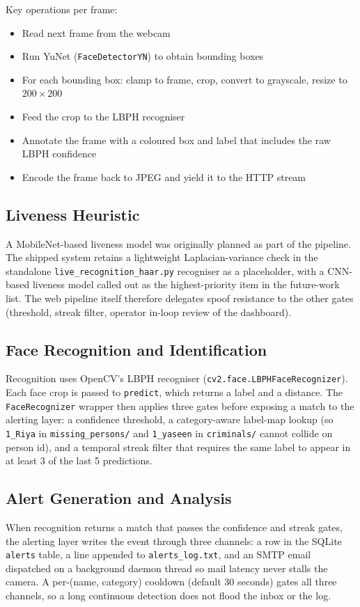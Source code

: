 \documentclass[11pt]{report}
\begin{document}
Key operations per frame:
\begin{itemize}
    \item Read next frame from the webcam
    \item Run YuNet (\texttt{FaceDetectorYN}) to obtain bounding boxes
    \item For each bounding box: clamp to frame, crop, convert to grayscale, resize to $200\times200$
    \item Feed the crop to the LBPH recogniser
    \item Annotate the frame with a coloured box and label that includes the raw LBPH confidence
    \item Encode the frame back to JPEG and yield it to the HTTP stream
\end{itemize}

\subsection{Liveness Heuristic}
A MobileNet-based liveness model was originally planned as part of the pipeline. The shipped system retains a lightweight Laplacian-variance check in the standalone \texttt{live\_recognition\_haar.py} recogniser as a placeholder, with a CNN-based liveness model called out as the highest-priority item in the future-work list. The web pipeline itself therefore delegates spoof resistance to the other gates (threshold, streak filter, operator in-loop review of the dashboard).

\subsection{Face Recognition and Identification}
Recognition uses OpenCV's LBPH recogniser (\texttt{cv2.face.LBPHFaceRecognizer}). Each face crop is passed to \texttt{predict}, which returns a label and a distance. The \texttt{FaceRecognizer} wrapper then applies three gates before exposing a match to the alerting layer: a confidence threshold, a category-aware label-map lookup (so \texttt{1\_Riya} in \texttt{missing\_persons/} and \texttt{1\_yaseen} in \texttt{criminals/} cannot collide on person id), and a temporal streak filter that requires the same label to appear in at least 3 of the last 5 predictions.


\subsection{Alert Generation and Analysis}
When recognition returns a match that passes the confidence and streak gates, the alerting layer writes the event through three channels: a row in the SQLite \texttt{alerts} table, a line appended to \texttt{alerts\_log.txt}, and an SMTP email dispatched on a background daemon thread so mail latency never stalls the camera. A per-(name, category) cooldown (default 30 seconds) gates all three channels, so a long continuous detection does not flood the inbox or the log.
\end{document}
